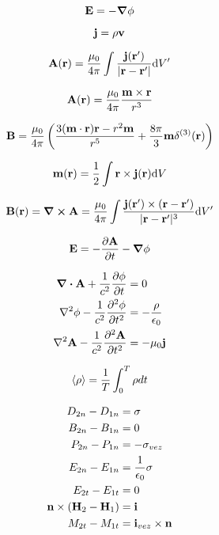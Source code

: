 \documentclass[11pt,twoside]{article}
\begin{document}
\begin{multicols}{3}
\begin{equation}
\vb{E} = - \gradient \phi
\end{equation}

\begin{equation}
\vb{j} = \rho \vb{v}
\end{equation}

\begin{equation}
\vb{A}(\vb{r}) = \frac{\mu_0}{4\pi} \int \frac{\vb{j}(\vb{r'})}{|\vb{r}-\vb{r'}|}\dd V'
\end{equation}

\begin{equation}
\vb{A}(\vb{r}) = \frac{\mu_0}{4\pi} \frac{\vb{m}\times\vb{r}}{r^3}
\end{equation}

\begin{equation}
\vb{B} = \frac{\mu_0}{4\pi} \left(\frac{3(\vb{m}\cdot\vb{r})\vb{r}-r^2\vb{m}}{r^5} + \frac{8\pi}{3}\vb{m}\delta^{(3)}(\vb{r})\right)
\end{equation}

\begin{equation}
\vb{m}(\vb{r}) = \frac{1}{2} \int \vb{r} \times \vb{j}(\vb{r})\dd V
\end{equation}

\begin{equation}
\vb{B}(\vb{r}) = \curl \vb{A} = \frac{\mu_0}{4\pi} \int \frac{\vb{j}(\vb{r'})\times (\vb{r}-\vb{r'})}{|\vb{r}-\vb{r'}|^3} \dd V'
\end{equation}

\begin{equation}
\vb{E} = -\pdv{\vb{A}}{t} - \gradient \phi
\end{equation}

\begin{equation}
\begin{split}
\div{\vb{A}} + \frac{1}{c^2} \pdv{\phi}{t} &= 0 \\
\laplacian{\phi} - \frac{1}{c^2} \pdv[2]{\phi}{t} &= -\frac{\rho}{\epsilon_0} \\
\laplacian{\vb{A}} - \frac{1}{c^2} \pdv[2]{\vb{A}}{t} &= -\mu_0 \vb{j}
\end{split}
\end{equation}

\begin{equation}
\expval{\rho} = \frac{1}{T} \int_0^T \rho dt 
\end{equation}

\begin{equation}
\begin{split}
D_{2n} - D_{1n} &= \sigma \\
B_{2n} - B_{1n} &= 0 \\
P_{2n} - P_{1n} &= -\sigma_{vez} \\
E_{2n} - E_{1n} &= \frac{1}{\epsilon_0} \sigma \\
E_{2t} - E_{1t} &= 0 \\
\vb{n}\times (\vb{H}_2 - \vb{H}_1) &= \vb{i} \\
M_{2t} - M_{1t} &= \vb{i}_{vez} \times \vb{n}
\end{split}
\end{equation}


\end{multicols}
\end{document}

